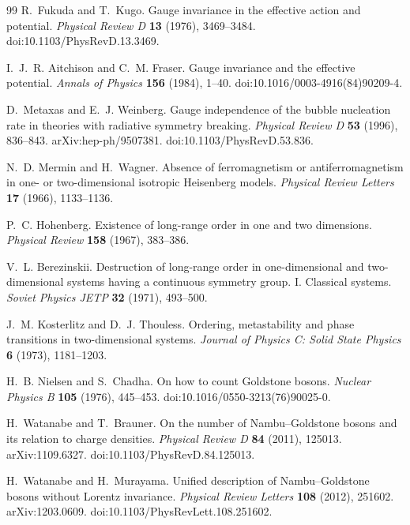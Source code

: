 \begin{thebibliography}{99}
R.~Fukuda and T.~Kugo.
Gauge invariance in the effective action and potential.
\emph{Physical Review D} \textbf{13} (1976), 3469--3484.
doi:10.1103/PhysRevD.13.3469.

I.~J.~R. Aitchison and C.~M. Fraser.
Gauge invariance and the effective potential.
\emph{Annals of Physics} \textbf{156} (1984), 1--40.
doi:10.1016/0003-4916(84)90209-4.

D.~Metaxas and E.~J. Weinberg.
Gauge independence of the bubble nucleation rate in theories with radiative
symmetry breaking.
\emph{Physical Review D} \textbf{53} (1996), 836--843.
arXiv:hep-ph/9507381.
doi:10.1103/PhysRevD.53.836.

N.~D. Mermin and H.~Wagner.
Absence of ferromagnetism or antiferromagnetism in one- or two-dimensional
isotropic Heisenberg models.
\emph{Physical Review Letters} \textbf{17} (1966), 1133--1136.

P.~C. Hohenberg.
Existence of long-range order in one and two dimensions.
\emph{Physical Review} \textbf{158} (1967), 383--386.

V.~L. Berezinskii.
Destruction of long-range order in one-dimensional and two-dimensional systems
having a continuous symmetry group. I. Classical systems.
\emph{Soviet Physics JETP} \textbf{32} (1971), 493--500.

J.~M. Kosterlitz and D.~J. Thouless.
Ordering, metastability and phase transitions in two-dimensional systems.
\emph{Journal of Physics C: Solid State Physics} \textbf{6} (1973),
1181--1203.

H.~B. Nielsen and S.~Chadha.
On how to count Goldstone bosons.
\emph{Nuclear Physics B} \textbf{105} (1976), 445--453.
doi:10.1016/0550-3213(76)90025-0.

H.~Watanabe and T.~Brauner.
On the number of Nambu--Goldstone bosons and its relation to charge densities.
\emph{Physical Review D} \textbf{84} (2011), 125013.
arXiv:1109.6327.
doi:10.1103/PhysRevD.84.125013.

H.~Watanabe and H.~Murayama.
Unified description of Nambu--Goldstone bosons without Lorentz invariance.
\emph{Physical Review Letters} \textbf{108} (2012), 251602.
arXiv:1203.0609.
doi:10.1103/PhysRevLett.108.251602.


\end{thebibliography}
